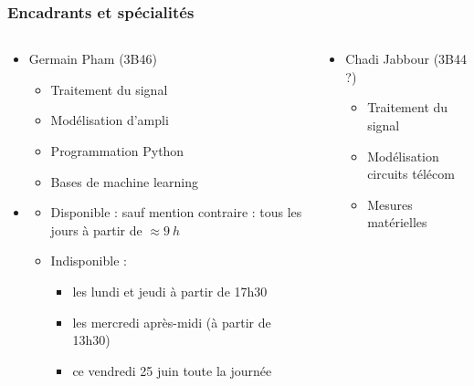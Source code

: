 \documentclass[aspectratio=169]{beamer}
\begin{document}
\begin{frame}
  \frametitle{Encadrants et spécialités}
\small
  \begin{columns}
    \begin{column}{0.6\textwidth}
      \begin{itemize}
        \item Germain Pham (3B46)
        \begin{itemize}
          \item Traitement du signal
          \item Modélisation d'ampli
          \item Programmation Python
          \item Bases de machine learning
        \end{itemize}
      \end{itemize}
      \begin{itemize}
        \item[]\begin{itemize}
          \item Disponible : sauf mention contraire : tous les jours à partir de $\approx\SI{9}{h}$
          \item Indisponible : 
          \begin{itemize}
            \item les lundi et jeudi à partir de 17h30
            \item les mercredi après-midi (à partir de 13h30)
            \item ce vendredi 25 juin toute la journée
          \end{itemize}
        \end{itemize}
      \end{itemize}
    \end{column}
    \begin{column}{0.6\textwidth}
      \begin{itemize}
        \item Chadi Jabbour (3B44 ?)
        \begin{itemize}
          \item Traitement du signal
          \item Modélisation circuits télécom
          \item Mesures matérielles
        \end{itemize}
      \end{itemize}
      
    \end{column}
  \end{columns}

\end{frame}
\end{document}
